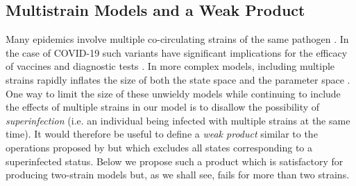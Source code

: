 \documentclass{article}
\theoremstyle{definition}
\begin{document}
\FloatBarrier


\subsection{Multistrain Models and a Weak Product}\label{wp}
Many epidemics involve multiple co-circulating strains of the same pathogen \citep{gog2002dynamics, williams2021localization}. In the case of COVID-19 such variants have significant implications for the efficacy of vaccines\citep{abu2021effectiveness, koyama2020emergence} and diagnostic tests \citep{vasireddy2021review}. In more complex models, including multiple strains rapidly inflates the size of both the state space and the parameter space \citep{kryazhimskiy2007state}. One way to limit the size of these unwieldy models while continuing to include the effects of multiple strains in our model is to disallow the possibility of \emph{superinfection} (i.e. an individual being infected with multiple strains at the same time). It would therefore be useful to define a \emph{weak product} similar to the operations proposed by \cite{worden2017products} but which excludes all states corresponding to a superinfected status. Below we propose such a product which is satisfactory for producing two-strain models but, as we shall see, fails for more than two strains.
\end{document}
